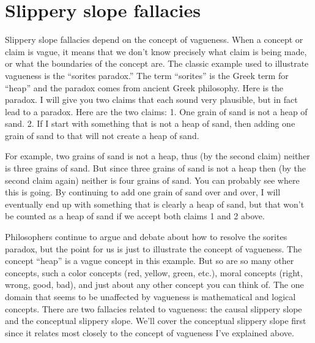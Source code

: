 \section{Slippery slope fallacies}
Slippery slope fallacies depend on the concept of vagueness. When a concept
or claim is vague, it means that we don't know precisely what claim is being
made, or what the boundaries of the concept are. The classic example used to
illustrate vagueness is the ``sorites paradox.'' The term ``sorites'' is the Greek
term for ``heap'' and the paradox comes from ancient Greek philosophy. Here is
the paradox. I will give you two claims that each sound very plausible, but in
fact lead to a paradox. Here are the two claims:
1. One grain of sand is not a heap of sand.
2. If I start with something that is not a heap of sand, then adding one
grain of sand to that will not create a heap of sand.

For example, two grains of sand is not a heap, thus (by the second claim) neither
is three grains of sand. But since three grains of sand is not a heap then (by the
second claim again) neither is four grains of sand. You can probably see where
this is going. By continuing to add one grain of sand over and over, I will
eventually end up with something that is clearly a heap of sand, but that won't
be counted as a heap of sand if we accept both claims 1 and 2 above.

Philosophers continue to argue and debate about how to resolve the sorites
paradox, but the point for us is just to illustrate the concept of vagueness. The
concept ``heap'' is a vague concept in this example. But so are so many other
concepts, such a color concepts (red, yellow, green, etc.), moral concepts (right,
wrong, good, bad), and just about any other concept you can think of. The one
domain that seems to be unaffected by vagueness is mathematical and logical
concepts. There are two fallacies related to vagueness: the causal slippery slope
and the conceptual slippery slope. We'll cover the conceptual slippery slope
first since it relates most closely to the concept of vagueness I've explained
above.

